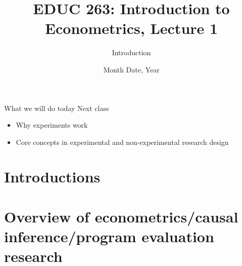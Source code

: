 
 

%


\title[EDUC 263, Lecture 1] {EDUC 263: Introduction to Econometrics, Lecture 1}
\subtitle{Introduction}
\date{Month Date, Year}



	
	
	\begin{frame}
	\titlepage
\end{frame}

\begin{frame}{What we will do today}
	\tableofcontents
	\vspace{5mm}
	Next class 
	\begin{itemize}
		\item Why experiments work
		\item Core concepts in experimental and non-experimental research design
	\end{itemize}				
\end{frame}


\section[Introductions]{Introductions}

\section[Course overview]{Overview of econometrics/causal inference/program evaluation research}


